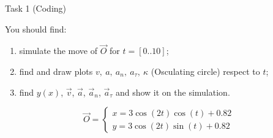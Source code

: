 \documentclass[aspectratio=169]{beamer}
\begin{document}
\begin{frame}[t]{Task 1 (Coding)}
\begin{minipage}{0.49\textwidth}

    
    You should find:
    \begin{enumerate}
        \item simulate the move of $\vec{O}$ for $t=[0..10]$;
        \item find and draw plots $v,\ a,\ a_n,\ a_\tau,\ \kappa $ (Osculating circle) respect to $t$;
        \item find  $y(x)$, $\vec{v}$, $\vec{a}$, $\vec{a}_n$, $\vec{a}_\tau$ and show it on the simulation.
    \end{enumerate}
    \end{minipage}
    \begin{minipage}{0.49\textwidth}
    \begin{equation*}
        \vec{O} = \left\{\begin{matrix}x = 3\cos(2t)\cos(t)+0.82\\y = 3\cos(2t)\sin(t)+0.82
        \end{matrix}\right.
    \end{equation*}
    \end{minipage}
\end{frame}

    
\end{document}

